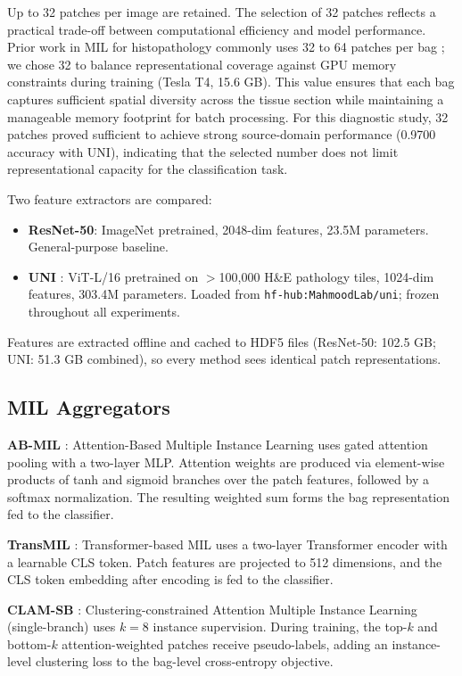 \documentclass[conference]{IEEEtran}
\begin{document}
Up to 32 patches per image are retained. The selection of 32 patches reflects a practical trade-off between computational efficiency and model performance. Prior work in MIL for histopathology commonly uses 32 to 64 patches per bag \cite{ilse2018attention, lu2021data}; we chose 32 to balance representational coverage against GPU memory constraints during training (Tesla T4, 15.6 GB). This value ensures that each bag captures sufficient spatial diversity across the tissue section while maintaining a manageable memory footprint for batch processing. For this diagnostic study, 32 patches proved sufficient to achieve strong source-domain performance (0.9700 accuracy with UNI), indicating that the selected number does not limit representational capacity for the classification task.

Two feature extractors are compared:

\begin{itemize}
    \item \textbf{ResNet-50}: ImageNet pretrained, 2048-dim features, 23.5M parameters. General-purpose baseline.
    \item \textbf{UNI} \cite{chen2024uni}: ViT-L/16 pretrained on $>$100,000 H\&E pathology tiles, 1024-dim features, 303.4M parameters. Loaded from \texttt{hf-hub:MahmoodLab/uni}; frozen throughout all experiments.
\end{itemize}

Features are extracted offline and cached to HDF5 files (ResNet-50: 102.5 GB; UNI: 51.3 GB combined), so every method sees identical patch representations.

\subsection{MIL Aggregators}

\textbf{AB-MIL} \cite{ilse2018attention}: Attention-Based Multiple Instance Learning uses gated attention pooling with a two-layer MLP. Attention weights are produced via element-wise products of tanh and sigmoid branches over the patch features, followed by a softmax normalization. The resulting weighted sum forms the bag representation fed to the classifier.

\textbf{TransMIL} \cite{shao2021transmil}: Transformer-based MIL uses a two-layer Transformer encoder with a learnable CLS token. Patch features are projected to 512 dimensions, and the CLS token embedding after encoding is fed to the classifier.

\textbf{CLAM-SB} \cite{lu2021data}: Clustering-constrained Attention Multiple Instance Learning (single-branch) uses $k=8$ instance supervision. During training, the top-$k$ and bottom-$k$ attention-weighted patches receive pseudo-labels, adding an instance-level clustering loss to the bag-level cross-entropy objective.
\end{document}
